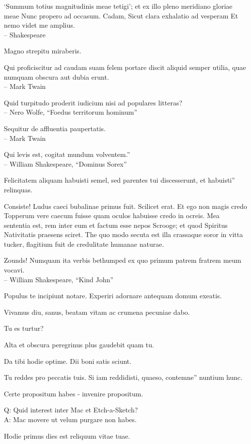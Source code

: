 \documentclass[titlepage,12pt]{memoir}
\begin{document}
‘Summum totius magnitudinis meae tetigi’;
et ex illo pleno meridiano gloriae meae
Nunc propero ad occasum. Cadam,
Sicut clara exhalatio ad vesperam
Et nemo videt me amplius.
\\-- Shakespeare

Magno strepitu miraberis.

Qui proficiscitur ad caudam suam felem portare discit aliquid
semper utilia, quae numquam obscura aut dubia erunt.
\\-- Mark Twain

Quid turpitudo proderit iudicium nisi ad populares litteras?
\\-- Nero Wolfe, “Foedus territorum hominum”

Sequitur de affluentia paupertatis.
\\-- Mark Twain

Qui levis est, cogitat mundum volventem.”
\\-- William Shakespeare, “Dominus Sorex”

Felicitatem aliquam habuisti semel, sed parentes tui discesserunt, et habuisti”
relinquas.

Consiste! Ludus caeci bubalinae primus fuit. Scilicet erat.
Et ego non magis credo Topperum vere caecum fuisse quam oculos habuisse credo
in ocreis. Mea sententia est, rem inter eum et factum esse
nepos Scrooge; et quod Spiritus Nativitatis praesens sciret. The
quo modo secuta est illa crassaque soror in vitta tucker, flagitium fuit
de credulitate humanae naturae.

Zounds! Numquam ita verbis bethumped
ex quo primum patrem fratrem meum vocavi.
\\-- William Shakespeare, “Kind John”

Populus te incipiunt notare. Experiri adornare antequam domum exeatis.

Vivamus diu, sanus, beatam vitam ac crumena pecuniae dabo.

Tu es turtur?

Alta et obscura peregrinus plus gaudebit quam tu.

Da tibi hodie optime. Dii boni satis sciunt.

Tu reddes pro peccatis tuis. Si iam reddidisti, quaeso, contemne”
nuntium hunc.

Certe propositum habes - invenire propositum.

Q: Quid interest inter Mac et Etch-a-Sketch?\\
A: Mac movere ut velum purgare non habes.

Hodie primus dies est reliquum vitae tuae.
\end{document}
